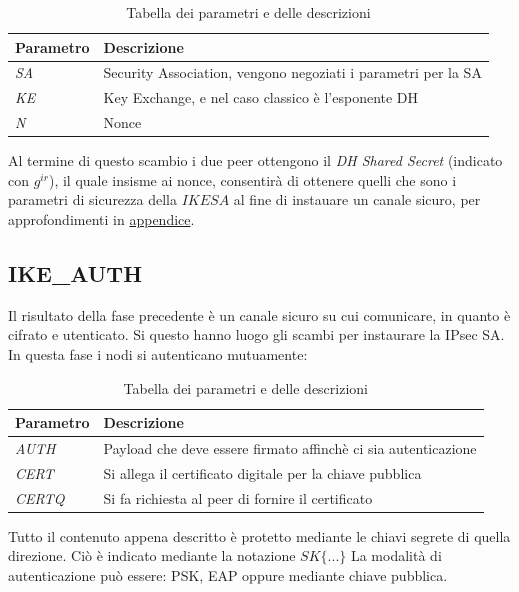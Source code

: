 \begin{table}[htbp]
    \centering
    \caption{Tabella dei parametri e delle descrizioni}
    \begin{tabular}{ll}
        \toprule
        \textbf{Parametro} & \textbf{Descrizione} \\
        \midrule
        \textit{SA} & Security Association, vengono negoziati i parametri per la SA\\
        \textit{KE} & Key Exchange, e nel caso classico è l'esponente DH \\
        \textit{N} & Nonce \\
    \bottomrule
    \end{tabular}
\end{table}

\noindent
Al termine di questo scambio i due peer ottengono il \textit{DH Shared Secret} (indicato con $g^{ir}$), il quale insisme ai nonce, consentirà di ottenere 
quelli che sono i parametri di sicurezza della $IKE SA$ al fine di instauare un canale sicuro, per approfondimenti in \href{AppendixA}{appendice}.


\subsection{IKE\_AUTH}

Il risultato della fase precedente è un canale sicuro su cui comunicare, in quanto è cifrato e utenticato. Si questo hanno luogo gli scambi per instaurare la IPsec SA.
In questa fase i nodi si autenticano mutuamente:

\begin{table}[htbp]
    \centering
    \caption{Tabella dei parametri e delle descrizioni}
    \begin{tabular}{ll}
        \toprule
        \textbf{Parametro} & \textbf{Descrizione} \\
        \midrule
        \textit{AUTH} & Payload che deve essere firmato affinchè ci sia autenticazione \\
        \textit{CERT} & Si allega il certificato digitale per la chiave pubblica \\
        \textit{CERTQ} & Si fa richiesta al peer di fornire il certificato \\
    \bottomrule
    \end{tabular}
\end{table}

Tutto il contenuto appena descritto è protetto mediante le chiavi segrete di quella direzione. Ciò è indicato mediante la notazione $SK\{...\}$
La modalità di autenticazione può essere: PSK, EAP oppure mediante chiave pubblica.

